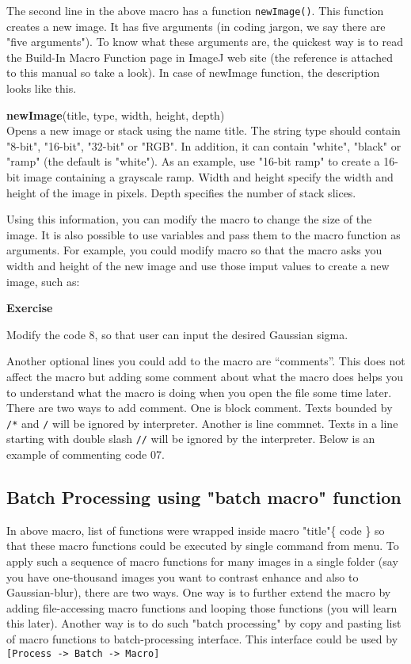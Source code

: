 \documentclass[11pt,a4paper,oneside]{report}
\newenvironment{indentexercise}[1]%
{{\setlength{\leftmargin}{2em}}%
\textbf{Exercise \thesubsection-#1}%
\begin{list}{}%
	\item%
}
{\end{list}}
\newenvironment{indentCom}%
{\begin{list}{}%
         {\setlength{\leftmargin}{1em}}%
         \item[]%
}
{\end{list}}
\newcommand{\ijmenu}[1]{\texttt{\small#1}}
\newcommand{\ilcom}[1]{\texttt{\small#1}}
\begin{document}


The second line in the above macro has a function \ilcom{newImage()}. This
function creates a new image. It has five arguments (in coding jargon, we say
there are "five arguments"). To know what these arguments are, 
the quickest way is to read the Build-In Macro Function page in ImageJ web site  
(the reference is attached to this manual so take a look).  
In case of newImage function, the description looks like this. 

\begin{indentCom}
\textbf{newImage}(title, type, width, height, depth)\\
Opens a new image or stack using the name title. 
The string type should contain "8-bit", "16-bit", "32-bit" or "RGB". 
In addition, it can contain "white", "black" or "ramp" (the default is "white"). 
As an example, use "16-bit ramp" to create a 16-bit image containing a grayscale ramp. 
Width and height specify the width and height of the image in pixels. 
Depth specifies the number of stack slices.
\end{indentCom}
Using this information, you can modify the macro to change the size of the image. 
It is also possible to use variables and pass them to the macro function as arguments. 
For example, you could modify macro so that the macro asks you width and height
of the new image and use those imput values to create a new image, such as:


\begin{indentexercise}{1}
Modify the code 8, so that user can input the desired Gaussian sigma.
\end{indentexercise}

Another optional lines you could add to the macro are ``comments''. This does not affect the macro but adding some comment about what the macro does helps you to understand what the macro is doing when you open the file some time later. There are two ways to add comment. One is block comment. Texts bounded by \ilcom{ /*} and \ilcom{*/} will be ignored by interpreter. Another is line commnet. Texts in a line starting with double slash \ilcom{//} will be ignored by the interpreter. Below is an example of commenting code 07. 




\subsection{Batch Processing using "batch macro" function}
In above macro, list of functions were wrapped inside macro "title"\{ code \} 
so that these macro functions could be executed by single command from menu. 
To apply such a sequence of macro functions for many images in a single folder 
(say you have one-thousand images you want to contrast enhance and also to Gaussian-blur), 
there are two ways. One way is to further extend the macro by adding file-accessing macro functions and 
looping those functions (you will learn this later). 
Another way is to do such "batch processing" by copy and pasting list of
macro functions to batch-processing interface. 
This interface could be used by \ijmenu{[Process -> Batch -> Macro]}
\end{document}
